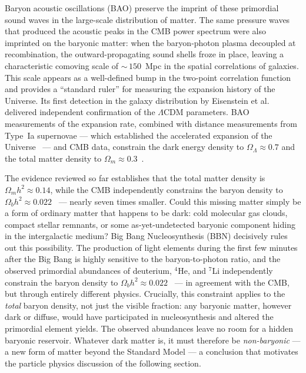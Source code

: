 Baryon acoustic oscillations (BAO) preserve the imprint of these primordial sound waves in the large-scale distribution of matter.
The same pressure waves that produced the acoustic peaks in the CMB power spectrum were also imprinted on the baryonic matter: when the baryon-photon plasma decoupled at recombination, the outward-propagating sound shells froze in place, leaving a characteristic comoving scale of ${\sim}\,150$~Mpc in the spatial correlations of galaxies.
This scale appears as a well-defined bump in the two-point correlation function and provides a ``standard ruler'' for measuring the expansion history of the Universe.
Its first detection in the galaxy distribution by Eisenstein et al.~\cite{SDSS:2005xqv} delivered independent confirmation of the $\Lambda$CDM parameters.
BAO measurements of the expansion rate, combined with distance measurements from Type~Ia supernovae --- which established the accelerated expansion of the Universe~\cite{SupernovaSearchTeam:1998fmf,SupernovaCosmologyProject:1998vns} --- and CMB data, constrain the dark energy density to $\Omega_\Lambda \approx 0.7$ and the total matter density to $\Omega_m \approx 0.3$~\cite{Aghanim:2018eyx,Pan-STARRS1:2017jku}.

The evidence reviewed so far establishes that the total matter density is $\Omega_m h^2 \approx 0.14$, while the CMB independently constrains the baryon density to $\Omega_b h^2 \approx 0.022$~\cite{Aghanim:2018eyx} --- nearly seven times smaller.
Could this missing matter simply be a form of ordinary matter that happens to be dark: cold molecular gas clouds, compact stellar remnants, or some as-yet-undetected baryonic component hiding in the intergalactic medium?
Big Bang Nucleosynthesis (BBN) decisively rules out this possibility.
The production of light elements during the first few minutes after the Big Bang is highly sensitive to the baryon-to-photon ratio, and the observed primordial abundances of deuterium, $^4$He, and $^7$Li independently constrain the baryon density to $\Omega_b h^2 \approx 0.022$~\cite{Iocco:2008va,ParticleDataGroup:2022pth} --- in agreement with the CMB, but through entirely different physics.
Crucially, this constraint applies to the \emph{total} baryon density, not just the visible fraction: any baryonic matter, however dark or diffuse, would have participated in nucleosynthesis and altered the primordial element yields.
The observed abundances leave no room for a hidden baryonic reservoir.
Whatever dark matter is, it must therefore be \emph{non-baryonic} --- a new form of matter beyond the Standard Model --- a conclusion that motivates the particle physics discussion of the following section.
